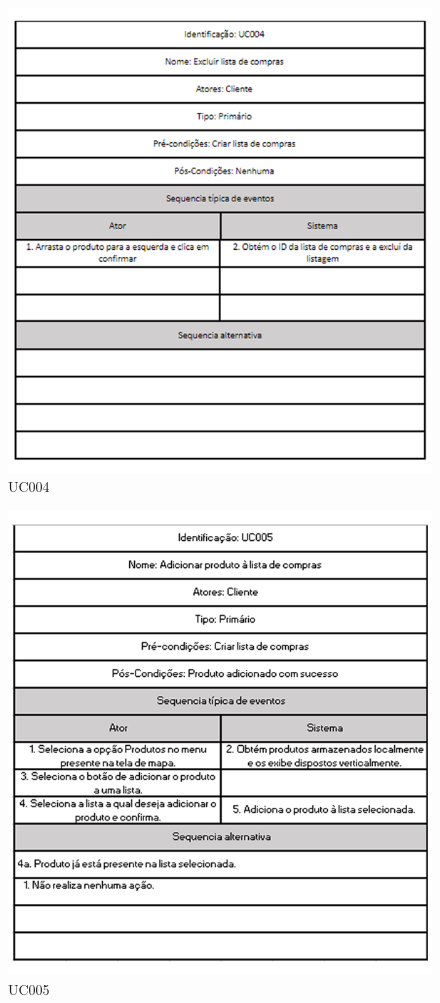 \begin{figure}[H]
	\centering
		\caption{UC004}
		\includegraphics[scale=0.8]{Imagens/UC004.PNG}
\end{figure}
	
\begin{figure}[H]
	\centering
		\caption{UC005}
		\includegraphics[scale=0.8]{Imagens/UC005.PNG}
\end{figure}

